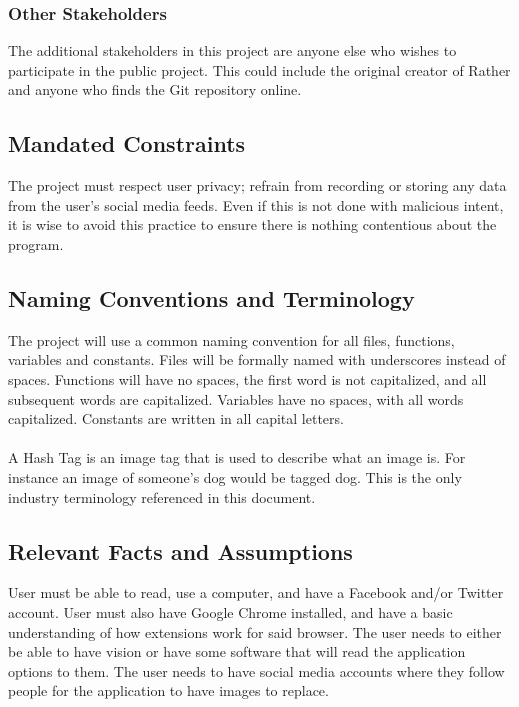 \documentclass[12pt, titlepage]{article}
\begin{document}
\subsubsection{Other Stakeholders}
The additional stakeholders in this project are anyone else who wishes to participate in the public project. This could include the original creator of Rather and anyone who finds the Git repository online. 

\subsection{Mandated Constraints}
The project must respect user privacy; refrain from recording or storing any data from the user's social media feeds. Even if this is not done with malicious intent, it is wise to avoid this practice to ensure there is nothing contentious about the program.

\subsection{Naming Conventions and Terminology}
The project will use a common naming convention for all files, functions, variables and constants. Files will be formally named with underscores instead of spaces. Functions will have no spaces, the first word is not capitalized, and all subsequent words are capitalized. Variables have no spaces, with all words capitalized. Constants are written in all capital letters.\\
\\
 A Hash Tag is an image tag that is used to describe what an image is. For instance an image of someone's dog would be tagged dog. This is the only industry terminology referenced in this document.  

\subsection{Relevant Facts and Assumptions}
User must be able to read, use a computer, and have a Facebook and/or Twitter account. User must also have Google Chrome installed, and have a basic understanding of how extensions work for said browser. The user needs to either be able to have vision or have some software that will read the application options to them. The user needs to have social media accounts where they follow people for the application to have images to replace.%
\end{document}
